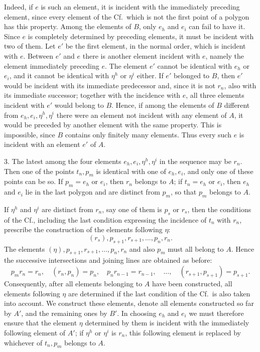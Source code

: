 \documentclass[11pt]{article}
\newcommand{\Cf}{\textup{Cf.}}
\begin{document}
Indeed, if $e$ is such an element, it is incident with the immediately preceding element, since every element of the \Cf\ which is not the first point of a polygon has this property. Among the elements of $B$, only $e_h$ and $e_i$ can fail to have it. Since $e$ is completely determined by preceding elements, it must be incident with two of them. Let $e'$ be the first element, in the normal order, which is incident with $e$. Between $e'$ and $e$ there is another element incident with $e$, namely the element immediately preceding $e$. The element $e'$ cannot be identical with $e_h$ or $e_i$, and it cannot be identical with $\eta^h$ or $\eta^i$ either. If $e'$ belonged to $B$, then $e'$ would be incident with its immediate predecessor and, since it is not $r_n$, also with its immediate successor; together with the incidence with $e$, all three elements incident with $e'$ would belong to $B$. Hence, if among the elements of $B$ different from $e_h,e_i,\eta^h,\eta^i$ there were an element not incident with any element of $A$, it would be preceded by another element with the same property. This is impossible, since $B$ contains only finitely many elements. Thus every such $e$ is incident with an element $e'$ of $A$.

3. The latest among the four elements $e_h,e_i,\eta^h,\eta^i$ in the sequence may be $r_n$. Then one of the points $t_n,p_m$ is identical with one of $e_h,e_i$, and only one of these points can be so. If $p_m=e_h$ or $e_i$, then $r_n$ belongs to $A$; if $t_n=e_h$ or $e_i$, then $e_h$ and $e_i$ lie in the last polygon and are distinct from $p_m$, so that $p_m$ belongs to $A$.

If $\eta^h$ and $\eta^i$ are distinct from $r_n$, say one of them is $p_s$ or $r_s$, then the conditions of the \Cf, including the last condition expressing the incidence of $t_n$ with $r_n$, prescribe the construction of the elements following $\eta$:
\[
(r_s),p_{s+1},r_{s+1},\ldots,p_n,r_n.
\]
The elements $(\eta),p_{s+1},r_{s+1},\ldots,p_n,r_n$ and also $p_m$ must all belong to $A$. Hence the successive intersections and joining lines are obtained as before:
\[
p_m r_n=r_n,
\quad (r_n,p_n)=p_n,
\quad p_n r_{n-1}=r_{n-1},
\quad\ldots,
\quad (r_{s+1},p_{s+1})=p_{s+1}.
\]
Consequently, after all elements belonging to $A$ have been constructed, all elements following $\eta$ are determined if the last condition of the \Cf\ is also taken into account. We construct these elements, denote all elements constructed so far by $A'$, and the remaining ones by $B'$. In choosing $e_h$ and $e_i$ we must therefore ensure that the element $\eta$ determined by them is incident with the immediately following element of $A'$; if $\eta^h$ or $\eta^i$ is $r_n$, this following element is replaced by whichever of $t_n,p_m$ belongs to $A$.
\end{document}
